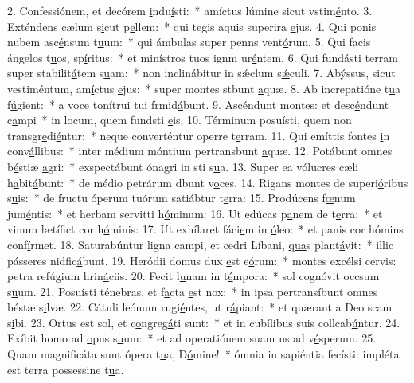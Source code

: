 2. Confessiónem, et decórem \uline{i}ndu\uline{í}sti:~* amíctus lúmine sicut vstim\uline{é}nto.
3. Exténdens cælum s\uline{i}cut p\uline{e}llem:~* qui tegis aquis superira \uline{e}jus.
4. Qui ponis nubem asc\uline{é}nsum t\uline{u}um:~* qui ámbulas super penns vent\uline{ó}rum.
5. Qui facis ángelos t\uline{u}os, sp\uline{í}ritus:~* et minístros tuos ignm ur\uline{é}ntem.
6. Qui fundásti terram super stabilit\uline{á}tem s\uline{u}am:~* non inclinábitur in sǽclum s\uline{ǽ}culi.
7. Abýssus, sicut vestiméntum, am\uline{í}ctus \uline{e}jus:~* super montes stbunt \uline{a}quæ.
8. Ab increpatióne t\uline{u}a f\uline{ú}gient:~* a voce tonítrui tui frmid\uline{á}bunt.
9. Ascéndunt montes: et desc\uline{é}ndunt c\uline{a}mpi~* in locum, quem fundsti \uline{e}is.
10. Términum posuísti, quem non transgr\uline{e}di\uline{é}ntur:~* neque converténtur operre t\uline{e}rram.
11. Qui emíttis fontes \uline{i}n conv\uline{á}llibus:~* inter médium móntium pertransbunt \uline{a}quæ.
12. Potábunt omnes b\uline{é}stiæ \uline{a}gri:~* exspectábunt ónagri in sti s\uline{u}a.
13. Super ea vólucres cæli h\uline{a}bit\uline{á}bunt:~* de médio petrárum dbunt v\uline{o}ces.
14. Rigans montes de superi\uline{ó}ribus s\uline{u}is:~* de fructu óperum tuórum satiábtur t\uline{e}rra:
15. Prodúcens f\uline{œ}num jum\uline{é}ntis:~* et herbam servitti h\uline{ó}minum:
16. Ut edúcas p\uline{a}nem de t\uline{e}rra:~* et vinum lætífict cor h\uline{ó}minis:
17. Ut exhílaret fáci\uline{e}m in \uline{ó}leo:~* et panis cor hómins conf\uline{í}rmet.
18. Saturabúntur ligna campi, et cedri Líbani, \uline{qua}s plant\uline{á}vit:~* illic pásseres nidfic\uline{á}bunt.
19. Heródii domus dux \uline{e}st e\uline{ó}rum:~* montes excélsi cervis: petra refúgium hrin\uline{á}ciis.
20. Fecit l\uline{u}nam in t\uline{é}mpora:~* sol cognóvit occsum s\uline{u}um.
21. Posuísti ténebras, et f\uline{a}cta \uline{e}st nox:~* in ipsa pertransíbunt omnes béstæ s\uline{i}lvæ.
22. Cátuli leónum rugi\uline{é}ntes, ut r\uline{á}piant:~* et quærant a Deo scam s\uline{i}bi.
23. Ortus est sol, et c\uline{o}ngreg\uline{á}ti sunt:~* et in cubílibus suis collcab\uline{ú}ntur.
24. Exíbit homo ad \uline{o}pus s\uline{u}um:~* et ad operatiónem suam us ad v\uline{é}sperum.
25. Quam magnificáta sunt ópera t\uline{u}a, D\uline{ó}mine!~* ómnia in sapiéntia fecísti: impléta est terra possessine t\uline{u}a.
